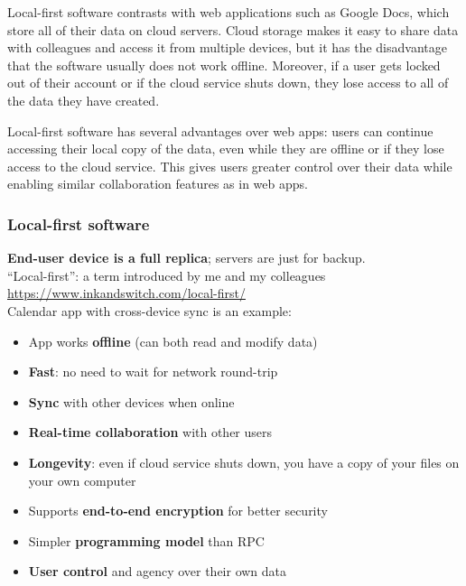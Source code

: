 Local-first software contrasts with web applications such as Google Docs, which store all of their data on cloud servers.
Cloud storage makes it easy to share data with colleagues and access it from multiple devices, but it has the disadvantage that the software usually does not work offline.
Moreover, if a user gets locked out of their account or if the cloud service shuts down, they lose access to all of the data they have created.

Local-first software has several advantages over web apps: users can continue accessing their local copy of the data, even while they are offline or if they lose access to the cloud service.
This gives users greater control over their data while enabling similar collaboration features as in web apps.


\begin{frame}
    \label{s:local-first}
    \frametitle{Local-first software}
    \textbf{End-user device is a full replica}; servers are just for backup.\\
    ``Local-first'': a term introduced by me and my colleagues\\
    \url{https://www.inkandswitch.com/local-first/}\\[1em]
    Calendar app with cross-device sync is an example:\pause
    \begin{itemize}
        \item App works \textbf{offline} (can both read and modify data)
        \item \textbf{Fast}: no need to wait for network round-trip
        \item \textbf{Sync} with other devices when online
        \item \textbf{Real-time collaboration} with other users\pause
        \item \textbf{Longevity}: even if cloud service shuts down, you have a copy of your files on your own computer
        \item Supports \textbf{end-to-end encryption} for better security
        \item Simpler \textbf{programming model} than RPC
        \item \textbf{User control} and agency over their own data
    \end{itemize}
\end{frame}
\label{l:local-first}

